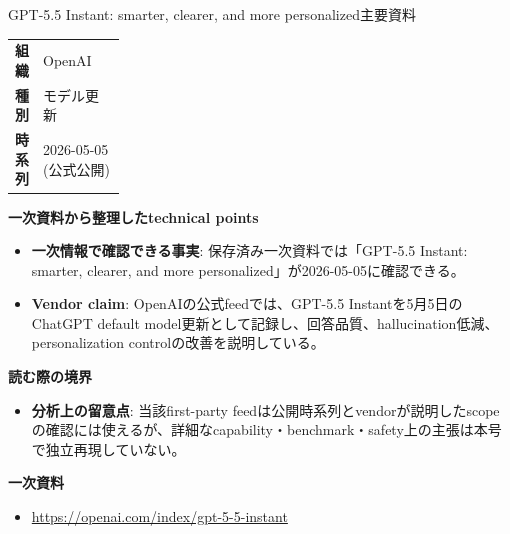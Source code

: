 \begin{technicalnote}{GPT-5.5 Instant: smarter, clearer, and more personalized}{主要資料}
\begingroup
\begin{tabularx}{\linewidth}{@{}>{\bfseries}p{0.22\linewidth}X@{}}
組織 & OpenAI \\
種別 & モデル更新 \\
時系列 & 2026-05-05 (公式公開) \\
\end{tabularx}
\smallskip
{\bfseries 一次資料から整理したtechnical points}
\begin{itemize}[leftmargin=1.5em,itemsep=0.35em]
\item \textbf{一次情報で確認できる事実}: 保存済み一次資料では「GPT-5.5 Instant: smarter, clearer, and more personalized」が2026-05-05に確認できる。
\end{itemize}
\begin{minipage}{\linewidth}
\begin{itemize}[leftmargin=1.5em,itemsep=0.35em]
\item \textbf{Vendor claim}: OpenAIの公式feedでは、GPT-5.5 Instantを5月5日のChatGPT default model更新として記録し、回答品質、hallucination低減、personalization controlの改善を説明している。
\end{itemize}
{\bfseries 読む際の境界}
\begin{itemize}[leftmargin=1.5em,itemsep=0.35em]
\item \textbf{分析上の留意点}: 当該first-party feedは公開時系列とvendorが説明したscopeの確認には使えるが、詳細なcapability・benchmark・safety上の主張は本号で独立再現していない。
\end{itemize}
\begin{samepage}
{\bfseries 一次資料}
\begingroup\sloppy
\begin{itemize}[leftmargin=1.5em,itemsep=0.25em]
\item {\scriptsize\url{https://openai.com/index/gpt-5-5-instant}}
\end{itemize}
\endgroup
\end{samepage}
\end{minipage}
\endgroup
\end{technicalnote}
\medskip

